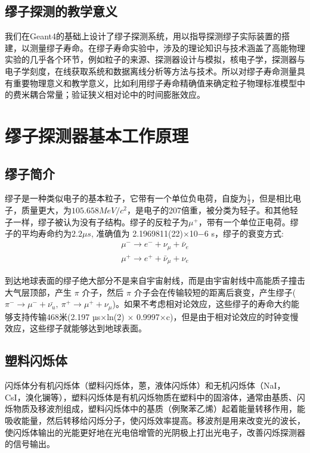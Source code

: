 \documentclass[UTF8]{ctexart}
\begin{document}
\subsection{缪子探测的教学意义}

我们在Geant4的基础上设计了缪子探测系统，用以指导探测缪子实际装置的搭建，以测量缪子寿命。在缪子寿命实验中，涉及的理论知识与技术涵盖了高能物理实验的几乎各个环节，例如粒子的来源、探测器设计与模拟，核电子学，探测器与电子学刻度，在线获取系统和数据离线分析等方法与技术。\cite{2}所以对缪子寿命测量具有重要物理意义和教学意义，比如利用缪子寿命精确值来确定粒子物理标准模型中的费米耦合常量；验证狭义相对论中的时间膨胀效应。

\section{缪子探测器基本工作原理}
\subsection{缪子简介}

缪子是一种类似电子的基本粒子，它带有一个单位负电荷，自旋为$\frac{1}{2}$，但是相比电子，质量更大，为$105. 658MeV/c^2$，是电子的207倍重，被分类为轻子。和其他轻子一样，缪子被认为没有子结构。缪子的反粒子为$\mu^+$，带有一个单位正电荷。\cite{3}缪子的平均寿命约为$2.2\mu s$, 准确值为 2.1969811(22)×10−6 s，缪子的衰变方式: \cite{4}\\
\begin{align}
\mu^- \rightarrow e^- + \nu_\mu + \bar\nu_e\\
\mu^+ \rightarrow e^+ + \bar\nu_\mu + \nu_e
\end{align}

到达地球表面的缪子绝大部分不是来自宇宙射线，而是由宇宙射线中高能质子撞击大气层顶部，产生 $\pi$ 介子，然后 $\pi$ 介子会在传输较短的距离后衰变，产生缪子($\pi^- \rightarrow \mu^- + \bar{\nu_u} ,\ \pi^+\rightarrow \mu^+ + \nu_\mu$)。如果不考虑相对论效应，这些缪子的寿命大约能够支持传输468米(2.197 µs×ln(2) × 0.9997×c)，但是由于相对论效应的时钟变慢效应，这些缪子就能够达到地球表面。\cite{3}

\subsection{塑料闪烁体}

闪烁体分有机闪烁体（塑料闪烁体，蒽，液体闪烁体）和无机闪烁体（NaI，CsI，溴化镧等），塑料闪烁体是有机闪烁物质在塑料中的固溶体，通常由基质、闪烁物质及移波剂组成，塑料闪烁体中的基质（例聚苯乙烯）起着能量转移作用，能吸收能量，然后转移给闪烁分子，使闪烁效率提高。移波剂是用来改变光的波长，使闪烁体输出的光能更好地在光电倍增管的光阴极上打出光电子，改善闪烁探测器的信号输出。
\end{document}

